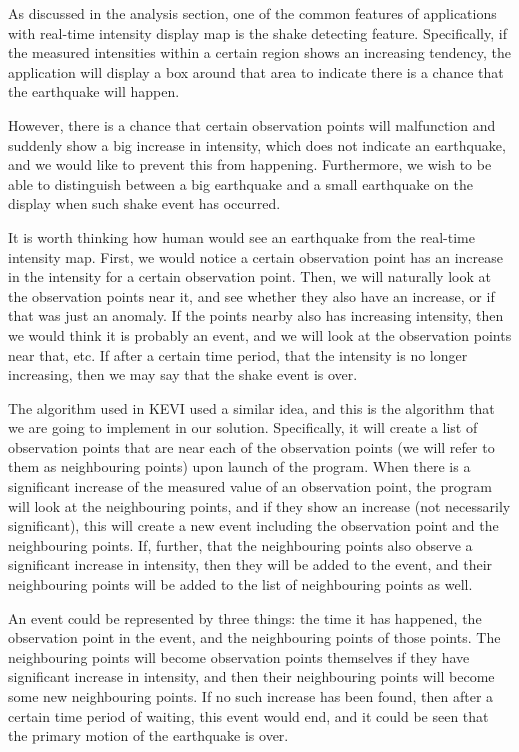 As discussed in the analysis section, one of the common features of applications with real-time intensity display map is the shake detecting feature. Specifically, if the measured intensities within a certain region shows an increasing tendency, the application will display a box around that area to indicate there is a chance that the earthquake will happen.

However, there is a chance that certain observation points will malfunction and suddenly show a big increase in intensity, which does not indicate an earthquake, and we would like to prevent this from happening. Furthermore, we wish to be able to distinguish between a big earthquake and a small earthquake on the display when such shake event has occurred.

It is worth thinking how human would see an earthquake from the real-time intensity map. First, we would notice a certain observation point has an increase in the intensity for a certain observation point. Then, we will naturally look at the observation points near it, and see whether they also have an increase, or if that was just an anomaly. If the points nearby also has increasing intensity, then we would think it is probably an event, and we will look at the observation points near that, etc. If after a certain time period, that the intensity is no longer increasing, then we may say that the shake event is over.

The algorithm used in KEVI used a similar idea, and this is the algorithm that we are going to implement in our solution. Specifically, it will create a list of observation points that are near each of the observation points (we will refer to them as neighbouring points) upon launch of the program. When there is a significant increase of the measured value of an observation point, the program will look at the neighbouring points, and if they show an increase (not necessarily significant), this will create a new event including the observation point and the neighbouring points. If, further, that the neighbouring points also observe a significant increase in intensity, then they will be added to the event, and their neighbouring points will be added to the list of neighbouring points as well.

An event could be represented by three things: the time it has happened, the observation point in the event, and the neighbouring points of those points. The neighbouring points will become observation points themselves if they have significant increase in intensity, and then their neighbouring points will become some new neighbouring points. If no such increase has been found, then after a certain time period of waiting, this event would end, and it could be seen that the primary motion of the earthquake is over.

